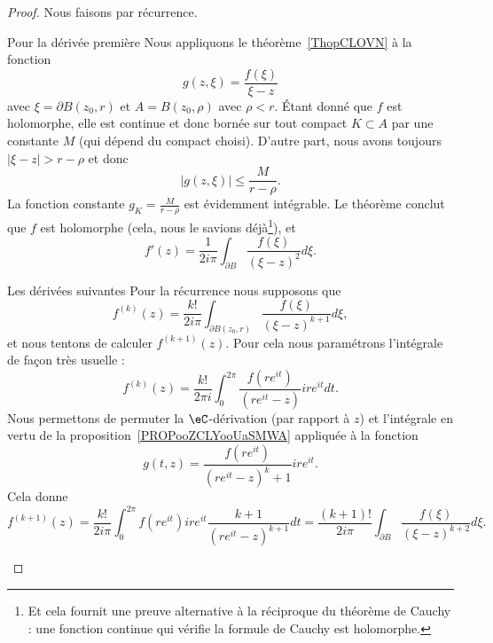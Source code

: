 \begin{proof}
	Nous faisons par récurrence.
	\begin{subproof}
		\item[Pour la dérivée première]
		Nous appliquons le théorème~\ref{ThopCLOVN} à la fonction
		\begin{equation}
			g(z,\xi)=\frac{ f(\xi) }{ \xi-z }
		\end{equation}
		avec \( \xi=\partial B(z_0,r)\) et \( A=B(z_0,\rho)\) avec \( \rho<r\). Étant donné que \( f\) est holomorphe, elle est continue et donc bornée sur tout compact \( K\subset A\) par une constante \( M\) (qui dépend du compact choisi).  D'autre part, nous avons toujours \( | \xi-z |>r-\rho\) et donc
		\begin{equation}
			| g(z,\xi) |\leq \frac{ M }{ r-\rho }.
		\end{equation}
		La fonction constante \( g_K=\frac{ M }{ r-\rho }\) est évidemment intégrable. Le théorème conclut que \( f\) est holomorphe (cela, nous le savions déjà\footnote{Et cela fournit une preuve alternative à la réciproque du théorème de Cauchy : une fonction continue qui vérifie la formule de Cauchy est holomorphe.}), et
		\begin{equation}
			f'(z)=\frac{1}{ 2i\pi }\int_{\partial B}\frac{ f(\xi) }{ (\xi-z)^2 }d\xi.
		\end{equation}

		\item[Les dérivées suivantes]
		Pour la récurrence\cite{ooKZJHooZhNpkf} nous supposons que
		\begin{equation}
			f^{(k)}(z)=\frac{k!}{ 2i\pi }\int_{\partial B(z_0,r)}\frac{ f(\xi) }{ (\xi-z)^{k+1} }d\xi,
		\end{equation}
		et nous tentons de calculer \( f^{(k+1)}(z)\). Pour cela nous paramétrons l'intégrale de façon très usuelle :
		\begin{equation}
			f^{(k)}(z)=\frac{ k! }{ 2\pi i }\int_0^{2\pi}\frac{ f(r e^{it}) }{ (r e^{it}-z) }ir e^{it}dt.
		\end{equation}
		Nous permettons de permuter la \( \eC\)-dérivation (par rapport à \( z\)) et l'intégrale en vertu de la proposition~\ref{PROPooZCLYooUaSMWA} appliquée à la fonction
		\begin{equation}
			g(t,z)=\frac{ f(r e^{it}) }{ (r e^{it}-z)^k+1 }ir e^{it}.
		\end{equation}
		Cela donne
		\begin{equation}
			f^{(k+1)}(z)=\frac{ k! }{ 2i\pi }\int_0^{2\pi}f(r e^{it})ir e^{it}\frac{ k+1 }{ (r e^{it}-z)^{k+1} }dt=\frac{ (k+1)! }{ 2i\pi }\int_{\partial B}\frac{ f(\xi) }{ (\xi-z)^{k+2} }d\xi.
		\end{equation}
	\end{subproof}
\end{proof}

